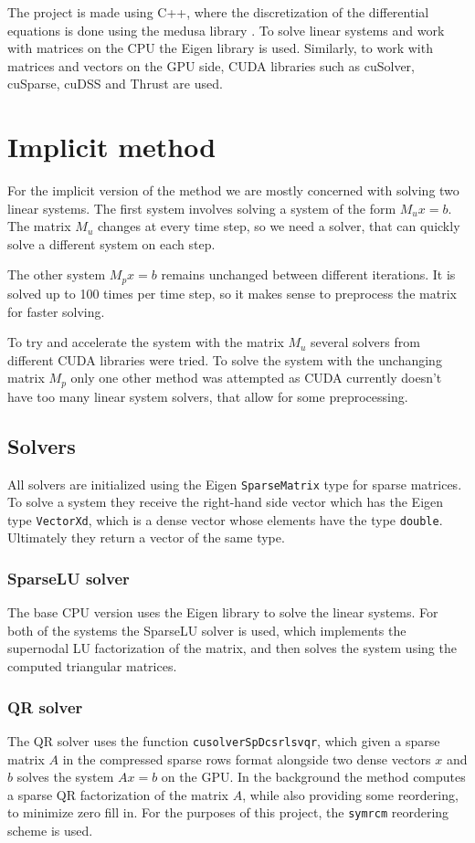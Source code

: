 \documentclass{article}
\begin{document}
The project is made using C++, where the discretization of the differential equations is done using 
the medusa library \cite{medusa}. To solve linear systems and work with matrices on the CPU the 
Eigen library is used. Similarly, to work with matrices and vectors on the GPU side, 
CUDA libraries such as cuSolver, cuSparse, cuDSS and Thrust are used.
\section{Implicit method}
For the implicit version of the method we are mostly concerned with solving two linear systems.
The first system involves solving a system of the form \(M_u x = b\). The matrix \(M_u\) changes at
every time step, so we need a solver, that can quickly solve a different system on each step.

The other system \(M_p x = b\) remains unchanged between different 
iterations. It is solved up to 100 times per time step, so it makes sense to preprocess the 
matrix for faster solving.

To try and accelerate the system with the matrix \(M_u\) several solvers from different CUDA libraries 
were tried. To solve the system with the unchanging matrix \(M_p\) only one other method was attempted
as CUDA currently doesn't have too many linear system solvers, that allow for some preprocessing. 

\subsection{Solvers}
All solvers are initialized using the Eigen \verb|SparseMatrix| type for sparse matrices. 
To solve a system they receive the right-hand side vector which has the Eigen type \verb|VectorXd|,
which is a dense vector whose elements have the type \verb|double|. Ultimately they return 
a vector of the same type.
\subsubsection{SparseLU solver}
The base CPU version uses the Eigen library to solve the linear systems. For both of the systems 
the SparseLU solver is used, which implements the supernodal LU factorization of the matrix, and then
solves the system using the computed triangular matrices.
\subsubsection{QR solver}
The QR solver uses the function \verb|cusolverSpDcsrlsvqr|, which given a sparse matrix \(A\) in the 
compressed sparse rows format alongside two dense vectors \(x\) and  \(b\) solves the 
system \(Ax=b\) on the GPU. In the background the method computes a sparse QR factorization of the matrix \(A\),
while also providing some reordering, to minimize zero fill in. For the purposes of this project,
the \verb|symrcm| reordering scheme is used.
\end{document}
